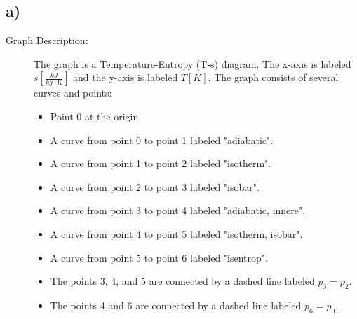 

\subsection*{a)}

\begin{description}
    \item[Graph Description:] The graph is a Temperature-Entropy (T-s) diagram. The x-axis is labeled $s \left[ \frac{kJ}{kg \cdot K} \right]$ and the y-axis is labeled $T \left[ K \right]$. The graph consists of several curves and points:
    \begin{itemize}
        \item Point 0 at the origin.
        \item A curve from point 0 to point 1 labeled "adiabatic".
        \item A curve from point 1 to point 2 labeled "isotherm".
        \item A curve from point 2 to point 3 labeled "isobar".
        \item A curve from point 3 to point 4 labeled "adiabatic, innere".
        \item A curve from point 4 to point 5 labeled "isotherm, isobar".
        \item A curve from point 5 to point 6 labeled "isentrop".
        \item The points 3, 4, and 5 are connected by a dashed line labeled $p_3 = p_2$.
        \item The points 4 and 6 are connected by a dashed line labeled $p_6 = p_0$.
    \end{itemize}
\end{description}